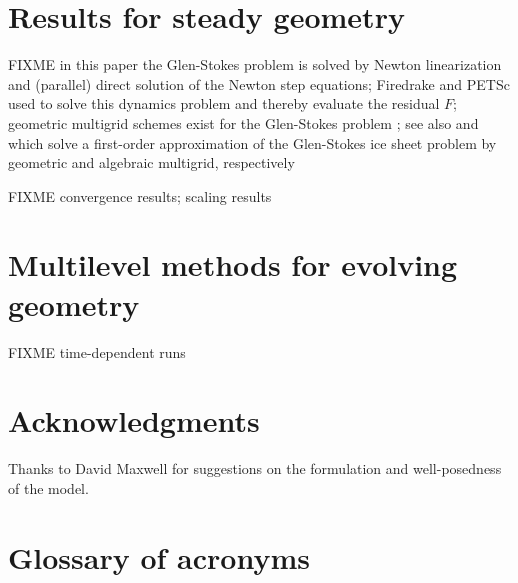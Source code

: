 \documentclass[letterpaper,final,12pt,reqno]{amsart}
\theoremstyle{claim}
\numberwithin{equation}{section}
\numberwithin{figure}{section}
\numberwithin{table}{section}
\numberwithin{theorem}{section}
\begin{document}
\section{Results for steady geometry} \label{sec:results}

FIXME in this paper the Glen-Stokes problem is solved by Newton linearization and (parallel) direct solution of the Newton step equations; Firedrake and PETSc \cite{Balayetal2020,Bueler2021} used to solve this dynamics problem and thereby evaluate the residual $F$; geometric multigrid schemes exist for the  Glen-Stokes problem \cite{IsaacStadlerGhattas2015}; see also \cite{BrownSmithAhmadia2013} and \cite{Tuminaroetal2016} which solve a first-order approximation of the Glen-Stokes ice sheet problem by geometric and algebraic multigrid, respectively

FIXME convergence results; scaling results


\section{Multilevel methods for evolving geometry} \label{sec:evolution}

FIXME time-dependent runs


\section*{Acknowledgments}  Thanks to David Maxwell for suggestions on the formulation and well-posedness of the model.

\small

\bigskip



\appendix

\section{Glossary of acronyms} \label{app:glossary}
\end{document}

